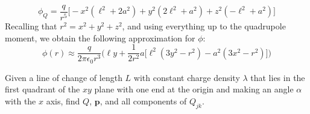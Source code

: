 \documentclass[crop=false,class=book,oneside]{standalone}
\begin{document}
\begin{solution}
                \begin{equation}
                    \phi_{Q}=\frac{q}{r^{5}}\Big[
                        \minus{x}^{2}(\ell^{2}+2a^{2})
                        +y^{2}(2\ell^{2}+a^{2})
                        +z^{2}(\minus\ell^{2}+a^{2})\Big]
                \end{equation}
                Recalling that $r^{2}=x^{2}+y^{2}+z^{2}$, and using
                everything up to the quadrupole moment, we obtain
                the following approximation for $\phi$:
                \begin{equation}
                    \phi(r)\approx
                        \frac{q}{2\pi\epsilon_{0}r^{3}}
                        \Big(
                            \ell{y}+\frac{1}{2r^{2}}a\big[
                            \ell^{2}(3y^{2}-r^{2})
                            -a^{2}(3x^{2}-r^{2})\big]
                        \Big)
                \end{equation}
            \end{solution}
            \begin{problem}
                Given a line of change of length $L$ with constant
                charge density $\lambda$ that lies in the first
                quadrant of the $xy$ plane with one end at the
                origin and making an angle $\alpha$ with the $x$
                axis, find $Q$, $\mathbf{p}$, and all components of
                $Q_{jk}$. 
            \end{problem}
\end{document}
